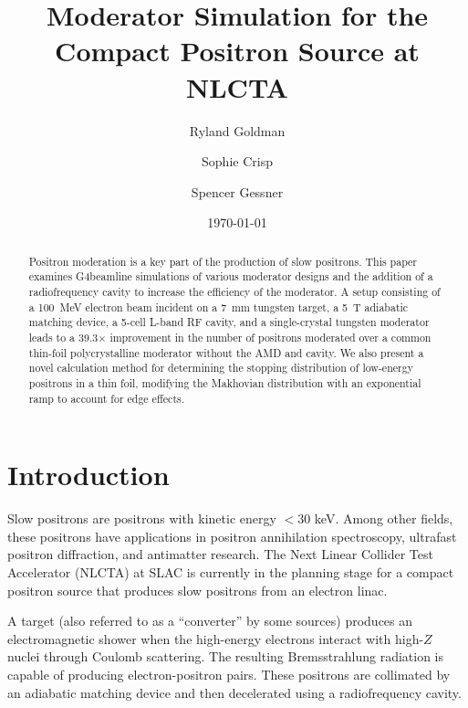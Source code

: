 \documentclass[aip,amsmath,amssymb,reprint,floatfix]{revtex4-1}
\begin{document}
\title[Moderator Simulation for the Compact Positron Source at NLCTA]{Moderator Simulation for the Compact Positron Source at NLCTA}
\author{Ryland Goldman}

\author{Sophie Crisp}

\author{Spencer Gessner}

\date{\today}

\begin{abstract}
Positron moderation is a key part of the production of slow positrons. This paper examines G4beamline simulations of various moderator designs and the addition of a radiofrequency cavity to increase the efficiency of the moderator. A setup consisting of a 100~MeV electron beam incident on a 7~mm tungsten target, a 5~T adiabatic matching device, a 5-cell L-band RF cavity, and a single-crystal tungsten moderator leads to a 39.3$\times$ improvement in the number of positrons moderated over a common thin-foil polycrystalline moderator without the AMD and cavity. We also present a novel calculation method for determining the stopping distribution of low-energy positrons in a thin foil, modifying the Makhovian distribution with an exponential ramp to account for edge effects.
\end{abstract}

\maketitle

\section{Introduction}
Slow positrons are positrons with kinetic energy $<30$ keV. Among other fields, these positrons have applications in positron annihilation spectroscopy, ultrafast positron diffraction, and antimatter research. The Next Linear Collider Test Accelerator (NLCTA) at SLAC is currently in the planning stage for a compact positron source that produces slow positrons from an electron linac.

A target (also referred to as a ``converter'' by some sources) produces an electromagnetic shower when the high-energy electrons interact with high-$Z$ nuclei through Coulomb scattering. The resulting Bremsstrahlung radiation is capable of producing electron-positron pairs. These positrons are collimated by an adiabatic matching device and then decelerated using a radiofrequency cavity.
\end{document}

